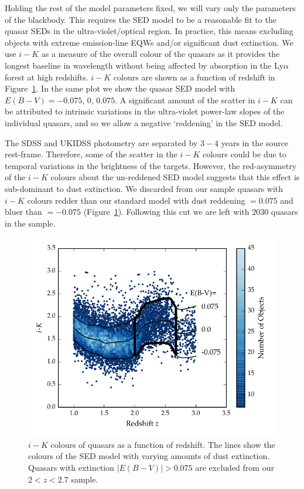 Holding the rest of the model parameters fixed, we will vary only the parameters of the blackbody. 
This requires the SED model to be a reasonable fit to the quasar SEDs in the ultra-violet/optical region. 
In practice, this means excluding objects with extreme emission-line EQWs and/or significant dust extinction.
We use $i-K$ as a measure of the overall colour of the quasars as it provides the longest baseline in wavelength without being affected by absorption in the Ly$\alpha$ forest at high redshifts. 
$i-K$ colours are shown as a function of redshift in Figure~\ref{fig:ikzplot}.
In the same plot we show the quasar SED model with $E(B-V)=-0.075,\,0,\,0.075$. 
A significant amount of the scatter in $i-K$ can be attributed to intrinsic variations in the ultra-violet power-law slopes of the individual quasars, and so we allow a negative `reddening' in the SED model. 

The SDSS and UKIDSS photometry are separated by $3-4$ years in the source rest-frame. 
Therefore, some of the scatter in the $i-K$ colours could be due to temporal variations in the brightness of the targets. 
However, the red-asymmetry of the $i-K$ colours about the un-reddened SED model suggests that this effect is sub-dominant to dust extinction. 
We discarded from our sample quasars with $i - K$ colours redder than our standard model with dust reddening \ebv $= 0.075$ and bluer than \ebv $=-0.075$ (Figure~\ref{fig:ikzplot}). 
Following this cut we are left with $2030$ quasars in the sample. 

\begin{figure}[t!]
  \centering
  \includegraphics[width=\columnwidth]{figures/chapter05/ik_versus_z_low_ext.pdf}
  \caption[{$i-K$ colours of quasars as a function of redshift.}]{$i-K$ colours of quasars as a function of redshift. The lines show the colours of the SED model with varying amounts of dust extinction. Quasars with extinction $|E(B-V)|>0.075$ are excluded from our $2 < z < 2.7$ sample.}
  \label{fig:ikzplot}
\end{figure}

